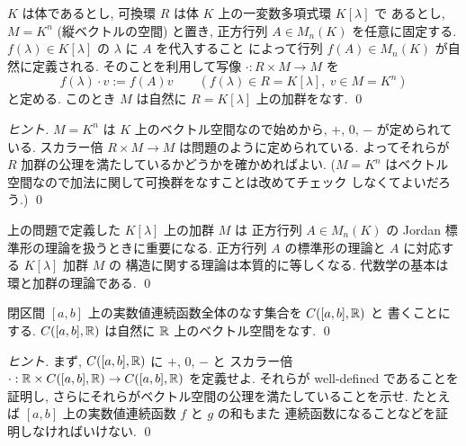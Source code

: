 \documentclass[12pt,twoside]{jarticle}
\begin{document}

\begin{question}
  $K$ は体であるとし, 可換環 $R$ は体 $K$ 上の一変数多項式環 $K[\lambda]$ で
  あるとし, $M=K^n$ (縦ベクトルの空間) と置き, 
  正方行列 $A\in M_n(K)$ を任意に固定する.
  $f(\lambda)\in K[\lambda]$ の $\lambda$ に $A$ を代入すること
  によって行列 $f(A)\in M_n(K)$ が自然に定義される.
  そのことを利用して写像 $\cdot:R\times M\to M$ を 
  \begin{equation*}
    f(\lambda)\cdot v := f(A)v
    \qquad
    (f(\lambda)\in R=K[\lambda],\ v\in M=K^n)
  \end{equation*}
  と定める. このとき $M$ は自然に $R=K[\lambda]$ 上の加群をなす. \qed
\end{question}

\begin{proof}[ヒント]
  $M=K^n$ は $K$ 上のベクトル空間なので始めから, $+$, $0$, $-$ が定められて
  いる. スカラー倍 $R\times M\to M$ は問題のように定められている.
  よってそれらが $R$ 加群の公理を満たしているかどうかを確かめればよい.
  ($M=K^n$ はベクトル空間なので加法に関して可換群をなすことは改めてチェック
  しなくてよいだろう.)
  \qed
\end{proof}

\begin{guide}
  上の問題で定義した $K[\lambda]$ 上の加群 $M$ は
  正方行列 $A\in M_n(K)$ の Jordan 標準形の理論を扱うときに重要になる.
  正方行列 $A$ の標準形の理論と $A$ に対応する $K[\lambda]$ 加群 $M$ の
  構造に関する理論は本質的に等しくなる.
  代数学の基本は環と加群の理論である.
  \qed
\end{guide}


\begin{question}[連続函数全体のなすベクトル空間]
  \label{q:C0-1}
  閉区間 $[a,b]$ 上の実数値連続函数全体のなす集合を $C([a,b],{\mathbb R})$ と
  書くことにする. $C([a,b],{\mathbb R})$ は自然に ${\mathbb R}$ 上のベクトル空間をなす.
  \qed
\end{question}

\begin{proof}[ヒント]
  まず, $C([a,b],{\mathbb R})$ に $+$, $0$, $-$ と
  スカラー倍 $\cdot:{\mathbb R}\times C([a,b],{\mathbb R})\to C([a,b],{\mathbb R})$ を定義せよ.
  それらが well-defined であることを証明し,
  さらにそれらがベクトル空間の公理を満たしていることを示せ.
  たとえば $[a,b]$ 上の実数値連続函数 $f$ と $g$ の和もまた
  連続函数になることなどを証明しなければいけない.
  \qed
\end{proof}
\end{document}
